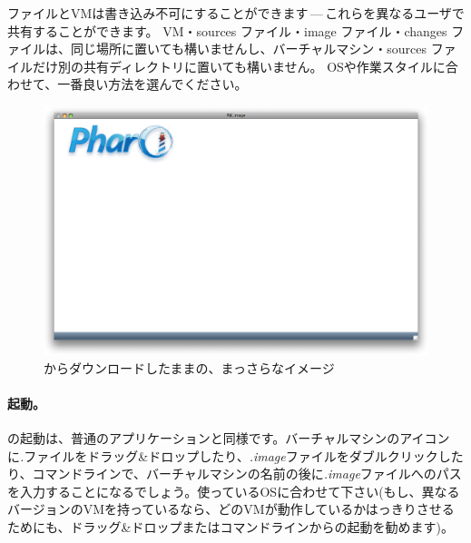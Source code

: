 \documentclass[a4paper,10pt,twoside]{book}
\begin{document}
ファイルとVMは書き込み不可にすることができます\,---\,これらを異なるユーザで共有することができます。
VM・sources ファイル・image ファイル・changes ファイルは、同じ場所に置いても構いませんし、バーチャルマシン・sources ファイルだけ別の共有ディレクトリに置いても構いません。
OSや作業スタイルに合わせて、一番良い方法を選んでください。


\begin{figure}[htb]
\centerline {\includegraphics[width=\textwidth]{startup}}
\caption{\pbe からダウンロードしたままの、まっさらなイメージ}
\end{figure}

\paragraph{起動。} \pharo の起動は、普通のアプリケーションと同様です。バーチャルマシンのアイコンに\emph{.}ファイルをドラッグ&ドロップしたり、\emph{.image}ファイルをダブルクリックしたり、コマンドラインで、バーチャルマシンの名前の後に\emph{.image}ファイルへのパスを入力することになるでしょう。使っているOSに合わせて下さい(もし、異なるバージョンのVMを持っているなら、どのVMが動作しているかはっきりさせるためにも、ドラッグ&ドロップまたはコマンドラインからの起動を勧めます)。
\end{document}
